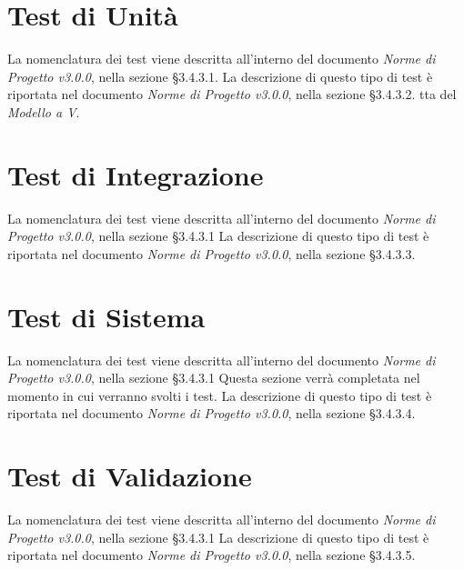 \section{Test di Unità}
\label{test_u}

La nomenclatura dei test viene descritta all'interno del documento \textit{Norme di Progetto v3.0.0}, nella sezione §3.4.3.1. La descrizione di questo tipo di test è riportata nel documento \textit{Norme di Progetto v3.0.0}, nella sezione §3.4.3.2.
tta del \textit{Modello a V}.




\newpage
\section{Test di Integrazione}
\label{test_i}
La nomenclatura dei test viene descritta all'interno del documento \textit{Norme di Progetto v3.0.0}, nella sezione §3.4.3.1 La descrizione di questo tipo di test è riportata nel documento \textit{Norme di Progetto v3.0.0}, nella sezione §3.4.3.3.



\newpage
\section{Test di Sistema}
\label{test_s}
La nomenclatura dei test viene descritta all'interno del documento \textit{Norme di Progetto v3.0.0}, nella sezione §3.4.3.1 Questa sezione verrà completata nel momento in cui verranno svolti i test. La descrizione di questo tipo di test è riportata nel documento \textit{Norme di Progetto v3.0.0}, nella sezione §3.4.3.4.




\newpage





\section{Test di Validazione}
\label{test_v}

La nomenclatura dei test viene descritta all'interno del documento \textit{Norme di Progetto v3.0.0}, nella sezione §3.4.3.1 La descrizione di questo tipo di test è riportata nel documento \textit{Norme di Progetto v3.0.0}, nella sezione §3.4.3.5.




